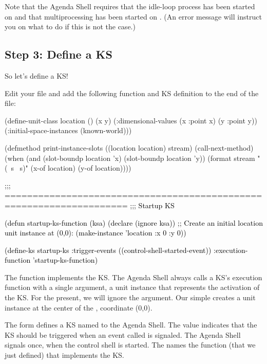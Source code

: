 \documentclass[10pt,twoside,english,pdftex]{article}
\begin{document}
Note that the Agenda Shell requires that the idle-loop process has been
started on  and that
multiprocessing has been started on
.  (An error message will
instruct you on what to do if this is not the case.)

\subsection*{Step 3: Define a KS}

So let's define a KS!

%
%
Edit your  file and add the following
function and KS definition to the end of the
 file:
%
\W\supp
\begin{example}
\textcolor{darkergray}{%
  (define-unit-class location ()
    (x y)
    (:dimensional-values
      (x :point x)
      (y :point y))
    (:initial-space-instances (known-world)))

  (defmethod print-instance-slots ((location location) stream)
    (call-next-method)
    (when (and (slot-boundp location 'x)
               (slot-boundp location 'y))
      (format stream " (~s ~s)"
              (x-of location)
              (y-of location))))

  \textcolor{black}{;;; ====================================================================
  ;;;   Startup KS

  (defun startup-ks-function (ksa)
    (declare (ignore ksa))
    ;; Create an initial location unit instance at (0,0):
    (make-instance 'location :x 0 :y 0))

  (define-ks startup-ks
      :trigger-events ((control-shell-started-event))
      :execution-function 'startup-ks-function)}}
\end{example}

The function  implements the KS.  The Agenda
Shell always calls a KS's execution function with a single argument, a
 unit instance that represents the activation of the KS.  For the
present, we will ignore the  argument.  Our simple
 creates a  unit
instance at the center of the , coordinate (0,0).

The  form defines a KS named 
to the Agenda Shell.  The  value indicates that
the KS should be triggered when an event called
 is signaled.  The Agenda Shell signals
 once, when the control shell is
started.  The  names the function (that we
just defined) that implements the KS.
\end{document}
